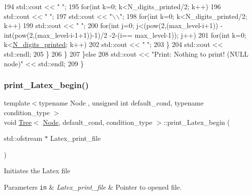 \begin{DoxyCode}
194                             std::cout << \textcolor{stringliteral}{" "};
195                     \textcolor{keywordflow}{for}(\textcolor{keywordtype}{int} k=0; k<N\_digits\_printed/2; k++)
196                         std::cout << \textcolor{stringliteral}{" "};
197                     std::cout << \textcolor{stringliteral}{"\(\backslash\)\(\backslash\)"};
198                     \textcolor{keywordflow}{for}(\textcolor{keywordtype}{int} k=0; k<N\_digits\_printed/2; k++)
199                         std::cout << \textcolor{stringliteral}{" "};
200                     \textcolor{keywordflow}{for}(\textcolor{keywordtype}{int} j=0; j<(pow(2,(max\_level-i+1)) - int(pow(2,(max\_level-i-1+1))-1)/2 -2-(i==
      max\_level-1)); j++)
201                         \textcolor{keywordflow}{for}(\textcolor{keywordtype}{int} k=0; k<\hyperlink{class_tree_ad24ef7cae6a7c0226280cf56bbc25f53}{N\_digits\_printed}; k++)
202                             std::cout << \textcolor{stringliteral}{" "};
203                 \}
204                 std::cout << std::endl;
205             \}
206         \}
207     \}\textcolor{keywordflow}{else}
208         std::cout << \textcolor{stringliteral}{"Print: Nothing to print! (NULL node)"} << std::endl;
209 \}
\end{DoxyCode}
\mbox{\label{class_tree_a5ff830823b2d44e86b61e4f882de3b6a}} 
\subsubsection{\texorpdfstring{print\+\_\+\+Latex\+\_\+begin()}{print\_Latex\_begin()}}
{\footnotesize\ttfamily template$<$typename Node , unsigned int default\+\_\+cond, typename condition\+\_\+type $>$ \\
void \hyperlink{class_tree}{Tree}$<$ \hyperlink{struct_node}{Node}, default\+\_\+cond, condition\+\_\+type $>$\+::print\+\_\+\+Latex\+\_\+begin (\begin{DoxyParamCaption}\item[{std\+::ofstream $\ast$}]{Latex\+\_\+print\+\_\+file }\end{DoxyParamCaption})\hspace{0.3cm}{\ttfamily [private]}}

Initiates the Latex file 
\begin{DoxyParams}[1]{Parameters}
\mbox{\tt in}  & {\em Latex\+\_\+print\+\_\+file} & Pointer to opened file. \\
\hline
\end{DoxyParams}

